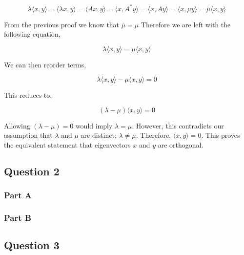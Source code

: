 \begin{equation}
  \lambda \langle x,y \rangle
  = \langle \lambda x,y \rangle
  = \langle Ax,y \rangle
  = \langle x,A^{*}y \rangle
  = \langle x,Ay \rangle
  = \langle x,\mu y \rangle
  = \bar{\mu} \langle x,y \rangle
\end{equation}

From the previous proof we know that \(\bar{\mu} = \mu\) Therefore we are left with the following equation,

\begin{equation}
  \lambda \langle x,y \rangle = \mu \langle x,y \rangle
\end{equation}

We can then reorder terms,

\begin{equation}
  \lambda \langle x,y \rangle - \mu \langle x,y \rangle = 0
\end{equation}

This reduces to,

\begin{equation}
  (\lambda - \mu) \langle x,y \rangle = 0
\end{equation}

Allowing \( (\lambda -\mu) = 0\) would imply \( \lambda = \mu \). However, this contradicts our assumption that \(\lambda\) and \(\mu\) are distinct; \( \lambda \ne \mu \). Therefore, \( \langle x,y \rangle = 0 \). This proves the equivalent statement that eigenvectors \(x\) and \(y\) are orthogonal.


\newpage
\subsection{Question 2}

\newpage
\subsubsection{Part A}

\newpage
\subsubsection{Part B}

\newpage
\subsection{Question 3}
